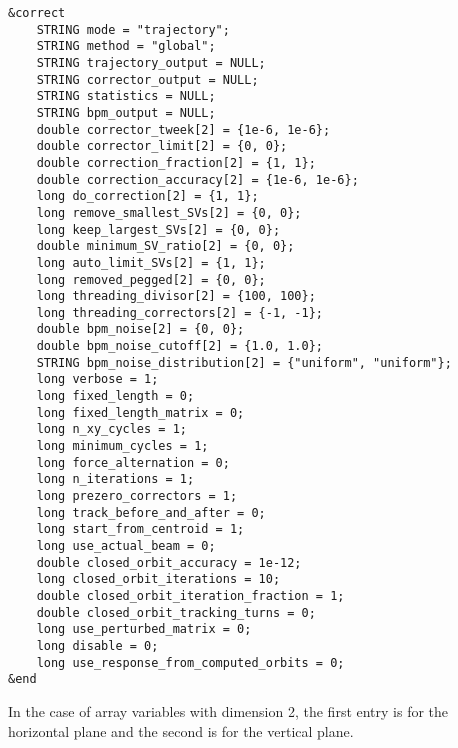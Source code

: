 \documentclass[11pt]{article}
\begin{document}
\begin{verbatim}
&correct
    STRING mode = "trajectory";
    STRING method = "global";
    STRING trajectory_output = NULL;
    STRING corrector_output = NULL;
    STRING statistics = NULL;
    STRING bpm_output = NULL;
    double corrector_tweek[2] = {1e-6, 1e-6};
    double corrector_limit[2] = {0, 0};
    double correction_fraction[2] = {1, 1};
    double correction_accuracy[2] = {1e-6, 1e-6};
    long do_correction[2] = {1, 1};
    long remove_smallest_SVs[2] = {0, 0};
    long keep_largest_SVs[2] = {0, 0};
    double minimum_SV_ratio[2] = {0, 0};
    long auto_limit_SVs[2] = {1, 1};
    long removed_pegged[2] = {0, 0};
    long threading_divisor[2] = {100, 100};
    long threading_correctors[2] = {-1, -1};
    double bpm_noise[2] = {0, 0};
    double bpm_noise_cutoff[2] = {1.0, 1.0};
    STRING bpm_noise_distribution[2] = {"uniform", "uniform"};
    long verbose = 1;
    long fixed_length = 0;
    long fixed_length_matrix = 0;
    long n_xy_cycles = 1;
    long minimum_cycles = 1;
    long force_alternation = 0;
    long n_iterations = 1;
    long prezero_correctors = 1;
    long track_before_and_after = 0;
    long start_from_centroid = 1;
    long use_actual_beam = 0;
    double closed_orbit_accuracy = 1e-12;
    long closed_orbit_iterations = 10;
    double closed_orbit_iteration_fraction = 1;
    double closed_orbit_tracking_turns = 0;
    long use_perturbed_matrix = 0;
    long disable = 0;
    long use_response_from_computed_orbits = 0;
&end
\end{verbatim}

In the case of array variables with dimension 2, the first entry is for the horizontal plane and the second
is for the vertical plane.
\end{document}
